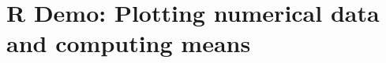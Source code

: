 \documentclass[slidestop,compress,mathserif]{beamer}
\makeatletter
\def\chpii@path{../../Chp 2}
\makeatother
\begin{document}
\section{R Demo: Plotting numerical data and computing means}












\end{document}
